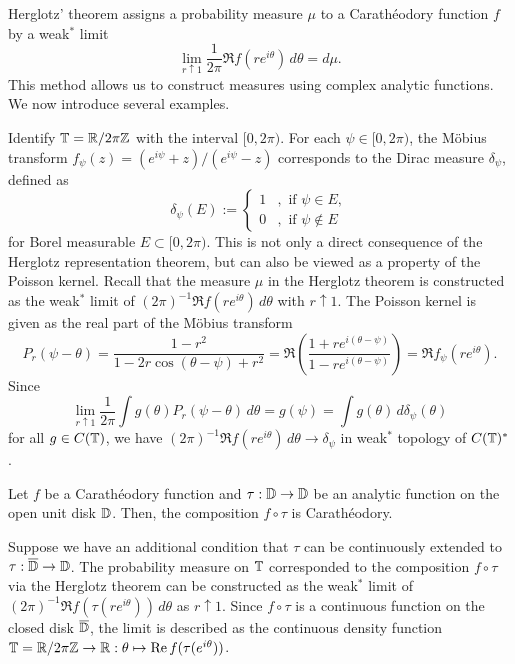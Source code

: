 \documentclass[a4paper]{article}
\begin{document}
Herglotz' theorem assigns a probability measure $\mu$ to a Carath\'eodory function $f$ by a weak$^*$ limit
\[\lim_{r\uparrow1}\frac1{2\pi}\Re f(re^{i\theta})\,d\theta=d\mu.\]
This method allows us to construct measures using complex analytic functions.
We now introduce several examples.

\begin{ex}
Identify $\mathbb{T}=\mathbb{R}/2\pi\mathbb{Z}$ with the interval $[0,2\pi)$.
For each $\psi\in[0,2\pi)$, the M\"obius transform $f_\psi(z)=(e^{i\psi}+z)/(e^{i\psi}-z)$ corresponds to the Dirac measure $\delta_\psi$, defined as
\[\delta_\psi(E):=\begin{cases}1&,\text{ if }\psi\in E,\\0&,\text{ if }\psi\notin E\end{cases}\]
for Borel measurable $E\subset[0,2\pi)$.
This is not only a direct consequence of the Herglotz representation theorem, but can also be viewed as a property of the Poisson kernel.
Recall that the measure $\mu$ in the Herglotz theorem is constructed as the weak$^*$ limit of $(2\pi)^{-1}\Re f(re^{i\theta})\,d\theta$ with $r\uparrow1$.
The Poisson kernel is given as the real part of the M\"obius transform
\[P_r(\psi-\theta)=\frac{1-r^2}{1-2r\cos(\theta-\psi)+r^2}=\Re\left(\frac{1+re^{i(\theta-\psi)}}{1-re^{i(\theta-\psi)}}\right)=\Re f_\psi(re^{i\theta}).\]
Since
\[\lim_{r\uparrow1}\frac1{2\pi}\int g(\theta)P_r(\psi-\theta)\,d\theta=g(\psi)=\int g(\theta)\,d\delta_\psi(\theta)\]
for all $g\in C(\mathbb{T})$, we have $(2\pi)^{-1}\Re f(re^{i\theta})\,d\theta\to\delta_\psi$ in weak$^*$ topology of $C(\mathbb{T})^*$.
\end{ex}


\begin{ex}
Let $f$ be a Carath\'eodory function and $\tau:\mathbb{D}\to\mathbb{D}$ be an analytic function on the open unit disk $\mathbb{D}$.
Then, the composition $f\circ\tau$ is Carath\'eodory.

Suppose we have an additional condition that $\tau$ can be continuously extended to $\tau:\overline{\mathbb{D}}\to\mathbb{D}$.
The probability measure on $\mathbb{T}$ corresponded to the composition $f\circ\tau$ via the Herglotz theorem can be constructed as the weak$^*$ limit of $(2\pi)^{-1}\Re f(\tau(re^{i\theta}))\,d\theta$ as $r\uparrow1$.
Since $f\circ\tau$ is a continuous function on the closed disk $\overline{\mathbb{D}}$, the limit is described as the continuous density function $\mathbb{T}=\mathbb{R}/2\pi\mathbb{Z}\to\mathbb{R}:\theta\mapsto\operatorname{Re} f(\tau(e^{i\theta}))$.
\end{ex}
\end{document}
